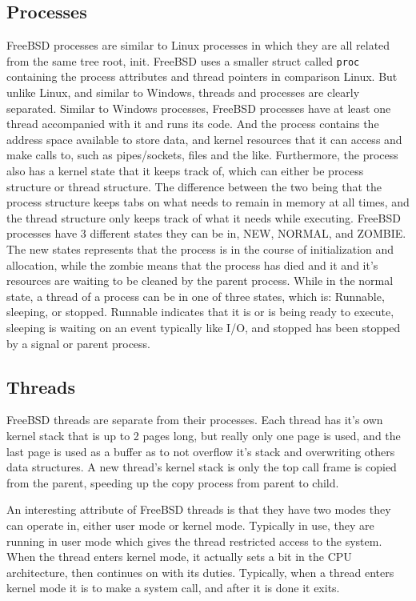 \documentclass[10pt,conference,draftclsnofoot,onecolumn]{IEEEtran}
\begin{document}
\subsection{Processes}
    FreeBSD processes are similar to Linux processes in which they are all related from the same tree root, init. FreeBSD uses a smaller struct called \texttt{proc} containing the process attributes and thread pointers in comparison Linux. But unlike Linux, and similar to Windows, threads and processes are clearly separated.
    Similar to Windows processes, FreeBSD processes have at least one thread accompanied with it and runs its code\cite{2}. And the process contains the address space available to store data, and kernel resources that it can access and make calls to, such as pipes/sockets, files and the like. Furthermore, the process also has a kernel state that it keeps track of, which can either be process structure or thread structure. The difference between the two being that the process structure keeps tabs on what needs to remain in memory at all times, and the thread structure only keeps track of what it needs while executing.
    FreeBSD processes have 3 different states they can be in, NEW, NORMAL, and ZOMBIE\cite{2}. The new states represents that the process is in the course of initialization and allocation, while the zombie means that the process has died and it and it’s resources are waiting to be cleaned by the parent process. While in the normal state, a thread of a process can be in one of three states, which is: Runnable, sleeping, or stopped. Runnable indicates that it is or is being ready to execute, sleeping is waiting on an event typically like I/O, and stopped has been stopped by a signal or parent process. 
    
\subsection{Threads}
    FreeBSD threads are separate from their processes. Each thread has it’s own kernel stack that is up to 2 pages long, but really only one page is used, and the last page is used as a buffer as to not overflow it’s stack and overwriting others data structures. A new thread's kernel stack is only the top call frame is copied from the parent, speeding up the copy process from parent to child. \cite{2} 
    
    An interesting attribute of FreeBSD threads is that they have two modes they can operate in, either user mode or kernel mode. Typically in use, they are running in user mode which gives the thread restricted access to the system. When the thread enters kernel mode, it actually sets a bit in the CPU architecture, then continues on with its duties. Typically, when a thread enters kernel mode it is to make a system call, and after it is done it exits. \cite{2}
\end{document}

